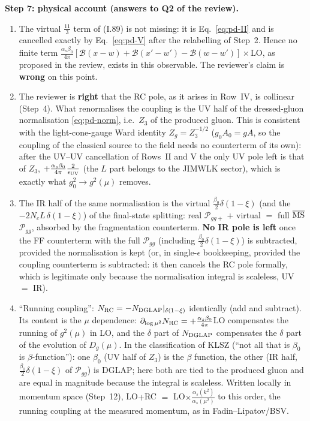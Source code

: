 \documentclass[10pt]{article}
\begin{document}
\medskip
\noindent\textbf{Step 7: physical account (answers to Q2 of the review).}
\begin{enumerate}
\item The virtual $\frac{11}{3}$ term of (I.89) is not missing: it is Eq.~\eqref{eq:pd-II} and is cancelled exactly by Eq.~\eqref{eq:pd-V} after the relabelling of Step~2. Hence no finite term $\frac{\alpha_{s}\beta_{0}}{4\pi}[\mathcal{B}(x-w)+\mathcal{B}(x'-w')-\mathcal{B}(w-w')]\times$LO, as proposed in the review, exists in this observable. The reviewer's claim is \textbf{wrong} on this point.
\item The reviewer is \textbf{right} that the RC pole, as it arises in Row~IV, is collinear (Step~4). What renormalises the coupling is the UV half of the dressed-gluon normalisation \eqref{eq:pd-norm}, i.e.\ $Z_{3}$ of the produced gluon. This is consistent with the light-cone-gauge Ward identity $Z_{g}=Z_{3}^{-1/2}$ ($g_{0}A_{0}=gA$, so the coupling of the classical source to the field needs no counterterm of its own): after the UV--UV cancellation of Rows~II and V the only UV pole left is that of $Z_{3}$, $+\frac{\alpha_{s}\beta_{0}}{4\pi}\frac{2}{\epsilon_{\rm UV}}$ (the $L$ part belongs to the JIMWLK sector), which is exactly what $g_{0}^{2}\to g^{2}(\mu)$ removes.
\item The IR half of the same normalisation is the virtual $\frac{\beta_{0}}{2}\delta(1-\xi)$ (and the $-2N_{c}L\,\delta(1-\xi)$) of the final-state splitting: real $\mathcal{P}_{gg+}$ $+$ virtual $=$ full $\overline{\rm MS}$ $\mathcal{P}_{gg}$, absorbed by the fragmentation counterterm. \textbf{No IR pole is left} once the FF counterterm with the full $\mathcal{P}_{gg}$ (including $\frac{\beta_{0}}{2}\delta(1-\xi)$) is subtracted, provided the normalisation is kept (or, in single-$\epsilon$ bookkeeping, provided the coupling counterterm is subtracted: it then cancels the RC pole formally, which is legitimate only because the normalisation integral is scaleless, UV $=$ IR).
\item ``Running coupling'': $N_{\rm RC}=-N_{\rm DGLAP}|_{\delta(1-\xi)}$ identically (add and subtract). Its content is the $\mu$ dependence: $\partial_{\log\mu^{2}}N_{\rm RC}=+\frac{\alpha_{s}\beta_{0}}{4\pi}$LO compensates the running of $g^{2}(\mu)$ in LO, and the $\delta$ part of $N_{\rm DGLAP}$ compensates the $\delta$ part of the evolution of $D_{g}(\mu)$. In the classification of KLSZ (``not all that is $\beta_{0}$ is $\beta$-function''): one $\beta_{0}$ (UV half of $Z_{3}$) is the $\beta$ function, the other (IR half, $\frac{\beta_{0}}{2}\delta(1-\xi)$ of $\mathcal{P}_{gg}$) is DGLAP; here both are tied to the produced gluon and are equal in magnitude because the integral is scaleless. Written locally in momentum space (Step~12), LO$+$RC $=$ LO$\times\frac{\alpha_{s}(k^{2})}{\alpha_{s}(\mu^{2})}$ to this order, the running coupling at the measured momentum, as in Fadin--Lipatov/BSV.
\end{enumerate}
\end{document}
